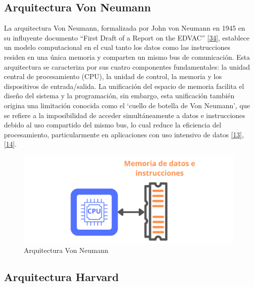 \documentclass[12pt,oneside]{templates/unerthesis}
\begin{document}
\hypertarget{arquitectura-von-neumann}{%
\subsection{Arquitectura Von Neumann}\label{arquitectura-von-neumann}}

La arquitectura Von Neumann, formalizada por John von Neumann en 1945 en su influyente documento ``First Draft of a Report on the EDVAC'' \protect\hyperlink{ref-vonneumann1945first}{{[}34{]}}, establece un modelo computacional en el cual tanto los datos como las instrucciones residen en una única memoria y comparten un mismo bus de comunicación. Esta arquitectura se caracteriza por sus cuatro componentes fundamentales: la unidad central de procesamiento (CPU), la unidad de control, la memoria y los dispositivos de entrada/salida. La unificación del espacio de memoria facilita el diseño del sistema y la programación, sin embargo, esta unificación también origina una limitación conocida como el `cuello de botella de Von Neumann', que se refiere a la imposibilidad de acceder simultáneamente a datos e instrucciones debido al uso compartido del mismo bus, lo cual reduce la eficiencia del procesamiento, particularmente en aplicaciones con uso intensivo de datos \protect\hyperlink{ref-hennessy2017computer}{{[}13{]}}, \protect\hyperlink{ref-stallings_computer_2021}{{[}14{]}}.

\begin{figure}

{\centering \includegraphics[width=0.85\linewidth]{images/vonneumann} 

}

\caption{Arquitectura Von Neumann}\label{fig:vonneumann}
\end{figure}

\hypertarget{arquitectura-harvard}{%
\subsection{Arquitectura Harvard}\label{arquitectura-harvard}}
\end{document}
